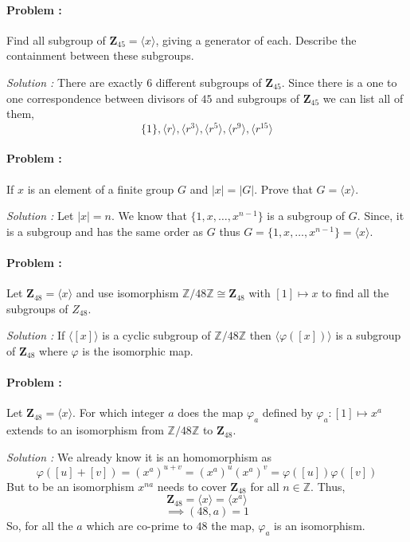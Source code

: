 \paragraph{Problem :} Find all subgroup of $\mathbf{Z}_{45} = \langle x \rangle$, giving a generator of each. Describe the containment 
between these subgroups.

\vspace{4mm}
\textit{Solution :} There are exactly $6$ different subgroups of $\mathbf{Z}_{45}$. Since there is a one to one correspondence between
divisors of $45$ and subgroups of $\mathbf{Z}_45$ we can list all of them,
\[ \{1\}, \langle r \rangle , \langle r^3 \rangle , \langle r^5 \rangle, \langle r^9 \rangle, \langle r^15 \rangle \]

\paragraph{Problem :} If $x$ is an element of a finite group $G$ and $|x|=|G|$. Prove that $G= \langle x \rangle$.

\vspace{4mm}
\textit{Solution :} Let $|x|=n$. We know that $\{1,x,\ldots,x^{n-1}\}$ is a subgroup of $G$. Since, it is a subgroup and has the same 
order as $G$ thus $G=\{1,x,\ldots,x^{n-1}\}=\langle x \rangle$.

\paragraph{Problem :} Let $\mathbf{Z}_{48}=\langle x \rangle$ and use isomorphism $\mathbb{Z}/48\mathbb{Z} \cong \mathbf{Z}_{48}$ with 
$[1] \mapsto x$ to find all the subgroups of $Z_{48}$.

\vspace{4mm}
\textit{Solution :} If $\langle [x] \rangle$ is a cyclic subgroup of $\mathbb{Z}/48\mathbb{Z}$ then $\langle \varphi([x]) \rangle$ is a subgroup
of $\mathbf{Z}_{48}$ where $\varphi$ is the isomorphic map.

\paragraph{Problem :} Let $\mathbf{Z}_{48}=\langle x \rangle$. For which integer $a$ does the map $\varphi_a$ defined by 
$\varphi_a : [1] \mapsto x^a$ extends to an isomorphism from $\mathbb{Z} / 48 \mathbb{Z}$ to $\mathbf{Z}_{48}$.

\vspace{4mm}
\textit{Solution :}  We already know it is an homomorphism as
\[ \varphi([u]+[v])=(x^{a})^{u+v}= (x^{a})^u (x^{a})^v = \varphi([u]) \varphi([v]) \]
But to be an isomorphism $x^{na}$ needs to cover $\mathbf{Z}_{48}$ for all $n \in \mathbb{Z}$. Thus,
\[ \mathbf{Z}_{48} = \langle x \rangle = \langle x^a \rangle \]
\[ \implies (48,a)=1 \]
So, for all the $a$ which are co-prime to $48$ the map, $\varphi_a$ is an isomorphism. 

